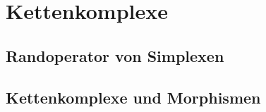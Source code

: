 %
%
%
\section{Kettenkomplexe
\label{buch:section:komplex}}

\subsection{Randoperator von Simplexen
\label{buch:subsection:randoperator-von-simplexen}}

\subsection{Kettenkomplexe und Morphismen
\label{buch:subsection:kettenkomplex}}
